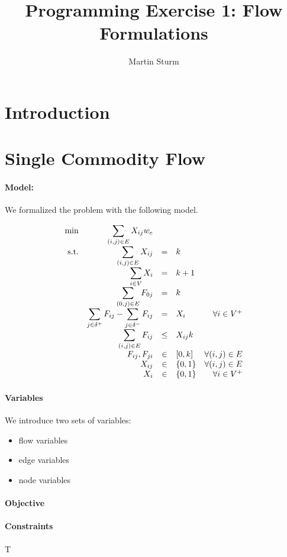 \documentclass{article}
\begin{document}
\title{Programming Exercise 1: Flow Formulations}
\author{Martin Sturm}
\maketitle
              
\section{Introduction}

\section{Single Commodity Flow}

\paragraph{Model:} We formalized the problem with the following model.
\newcommand{\edgesumrev}{\displaystyle \sum_{(j, i) \in A}}
\newcommand{\vmodeone}{Y_{ij}^1}
\newcommand{\vmodetwo}{Y_{ij}^2}
\newcommand{\nonnegint}{\mathbb{N}^0}


\newcommand{\binaries}{\{0, 1\}}
\newcommand{\edgesum}{\displaystyle \sum_{(i, j) \in E}}
\newcommand{\nodesum}{\displaystyle \sum_{i \in V}}
\newcommand{\vflow}{F_{ij}}
\newcommand{\vflowrev}{F_{ji}}
\newcommand{\vedge}{X_{ij}}
\newcommand{\vnode}{X_{i}}


\begin{equation}
\begin{array}{r r c l r}
\displaystyle \min & \edgesum {\vedge w_e} \\
\textrm{s.t.}  

& \edgesum \vedge & = & k & \\
& \nodesum \vnode & = & k + 1 & \\
& \displaystyle \sum_{(0, j) \in E} F_{0j} & = & k& \\
& \displaystyle \sum_{j \in \delta^+} \vflow - \displaystyle \sum_{j \in \delta^-} \vflow& = & \vnode & \forall i \in V^+ \\
& \edgesum F_{ij} & \leq & \vedge k & \\

& \vflow, \vflowrev & \in & [0, k]  &  \forall (i,j) \in E\\
& \vedge & \in & \binaries  &  \forall (i,j) \in E\\
& \vnode & \in & \binaries  &  \forall i \in V^+\\

\end{array}
\end{equation}

\paragraph{Variables} We introduce two sets of variables:
\begin{itemize}
	\item flow variables
	\item edge variables
	\item node variables
\end{itemize}

\paragraph{Objective} 
\paragraph{Constraints} T
\end{document}
